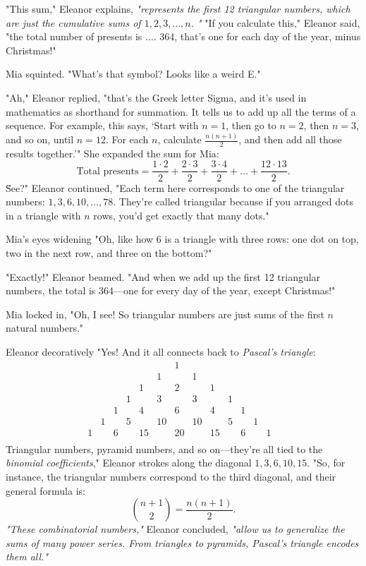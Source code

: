 "This sum," Eleanor explains, \textit{"represents the first 12 triangular numbers, which are just the cumulative sums of \(1, 2, 3, \dots, n\). "}
"If you calculate this," Eleanor said, "the total number of presents is .... 364, that's one for each day of the year, minus Christmas!"

Mia squinted. "What's that symbol? Looks like a weird E."

"Ah," Eleanor replied, "that’s the Greek letter Sigma, and it’s used in mathematics as shorthand for summation. It tells us to add up all the terms of a sequence. For example, this says, ‘Start with \(n = 1\), then go to \(n = 2\), then \(n = 3\), and so on, until \(n = 12\). For each \(n\), calculate \(\frac{n(n+1)}{2}\), and then add all those results together.’" She expanded the sum for Mia:
\[
\text{Total presents} = \frac{1 \cdot 2}{2} + \frac{2 \cdot 3}{2} + \frac{3 \cdot 4}{2} + \dots + \frac{12 \cdot 13}{2}.
\]
\"See?" Eleanor continued, "Each term here corresponds to one of the triangular numbers: \(1, 3, 6, 10, \dots, 78\). They’re called triangular because if you arranged dots in a triangle with \(n\) rows, you’d get exactly that many dots."

Mia’s eyes widening "Oh, like how 6 is a triangle with three rows: one dot on top, two in the next row, and three on the bottom?"

"Exactly!" Eleanor beamed. "And when we add up the first 12 triangular numbers, the total is 364—one for every day of the year, except Christmas!"

Mia locked in, "Oh, I see! So triangular numbers are just sums of the first \(n\) natural numbers."

Eleanor decoratively "Yes! And it all connects back to \textit{Pascal’s triangle}:
\[
\begin{array}{ccccccccccccccc}
& & & & & & 1 & & & & & & & \\
& & & & & 1 & & 1 & & & & & & \\
& & & & 1 & & 2 & & 1 & & & & & \\
& & & 1 & & 3 & & 3 & & 1 & & & & \\
& & 1 & & 4 & & 6 & & 4 & & 1 & & & \\
& 1 & & 5 & & 10 & & 10 & & 5 & & 1 & & \\
1 & & 6 & & 15 & & 20 & & 15 & & 6 & & 1 & \\
\end{array}
\]
Triangular numbers, pyramid numbers, and so on—they’re all tied to the \textit{binomial coefficients}," Eleanor strokes along the diagonal \( 1, 3, 6, 10, 15 \). "So, for instance, the triangular numbers correspond to the third diagonal, and their general formula is:
\[
\binom{n+1}{2} = \frac{n(n+1)}{2}.
\]
\textit{"These combinatorial numbers,"} Eleanor concluded, \textit{"allow us to generalize the sums of many power series. From triangles to pyramids, Pascal’s triangle encodes them all."}

